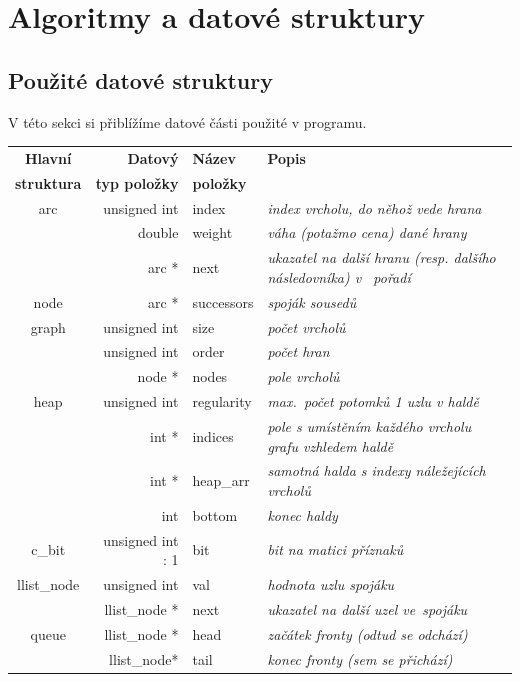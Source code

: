 \documentclass[11pt,a4paper]{article}
\begin{document}
\section{Algoritmy a datové struktury}
\subsection{Použité datové struktury}
V této sekci si přiblížíme datové části použité v programu.

\begin{tabular}{ | c || r | l | p{4cm} | }
  \hline
  \textbf{Hlavní} & \textbf{Datový} & \textbf{Název} & \textbf{Popis} \\
  \textbf{struktura} & \textbf{typ položky} & \textbf{položky} & \\
  \hline \hline
  arc & unsigned int & index & \textit{index vrcholu, do něhož vede hrana} \\
  & double & weight & \textit{váha (potažmo cena) dané hrany} \\ 
  & arc * & next & \textit{ukazatel na další hranu (resp. dalšího následovníka)
    v~ pořadí} \\
  \hline \hline
  node & arc * & successors & \textit{spoják sousedů} \\
  \hline \hline
  graph & unsigned int & size & \textit{počet vrcholů} \\
  & unsigned int & order & \textit{počet hran} \\
  & node * & nodes & \textit{pole vrcholů} \\ 
  \hline \hline
  heap & unsigned int & regularity & \textit{max.\ počet potomků 1 uzlu v haldě} \\
  & int * & indices & \textit{pole s umístěním každého vrcholu grafu vzhledem
    haldě} \\
  & int * & heap\_arr & \textit{samotná halda s indexy náležejících vrcholů} \\
  & int & bottom & \textit{konec haldy} \\ 
  \hline \hline
  c\_bit & unsigned int : 1 & bit & \textit{bit na matici příznaků} \\
  \hline \hline
  llist\_node & unsigned int & val & \textit{hodnota uzlu spojáku} \\
  & llist\_node * & next & \textit{ukazatel na další uzel ve~spojáku} \\
  \hline \hline
  queue & llist\_node * & head & \textit{začátek fronty (odtud se odchází)} \\
  & llist\_node* & tail & \textit{konec fronty (sem se přichází)} \\
  \hline
\end{tabular}
\end{document}
